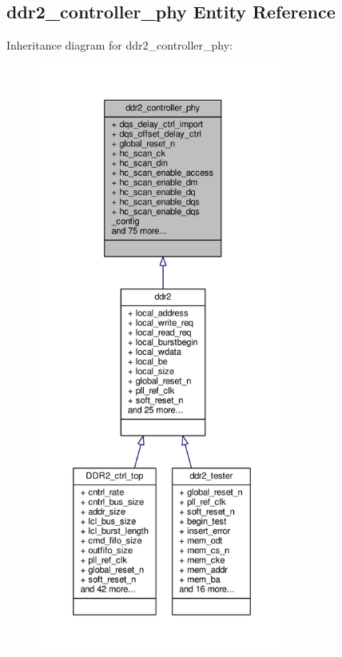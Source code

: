\subsection{ddr2\+\_\+controller\+\_\+phy Entity Reference}
\label{classddr2__controller__phy}


Inheritance diagram for ddr2\+\_\+controller\+\_\+phy\+:\nopagebreak
\begin{figure}[H]
\begin{center}
\leavevmode
\includegraphics[height=550pt]{d2/dc3/classddr2__controller__phy__inherit__graph}
\end{center}
\end{figure}


